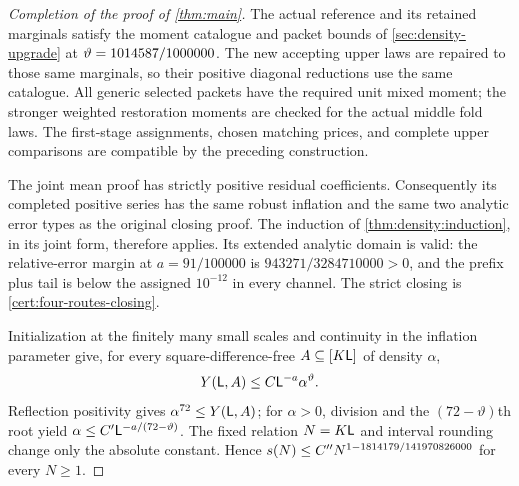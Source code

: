 \begin{proof}[Completion of the proof of \cref{thm:main}]
The actual reference and its retained marginals satisfy the moment
catalogue and packet bounds of \cref{sec:density-upgrade} at
$\vartheta=1014587/1000000$. The new accepting upper laws are
repaired to those same marginals, so their positive diagonal
reductions use the same catalogue. All generic selected packets
have the required unit mixed moment; the stronger weighted
restoration moments are checked for the actual middle fold laws.
The first-stage assignments, chosen matching prices, and complete
upper comparisons are compatible by the preceding construction.

The joint mean proof has strictly positive residual coefficients.
Consequently its completed positive series has the same robust
inflation and the same two analytic error types as the original
closing proof. The induction of \cref{thm:density:induction}, in
its joint form, therefore applies. Its extended analytic domain is
valid: the relative-error margin at $a=91/100000$ is
$943271/3284710000>0$, and the prefix plus tail is below the assigned
$10^{-12}$ in every channel. The strict closing is
\cref{cert:four-routes-closing}.

Initialization at the finitely many small scales and continuity in
the inflation parameter give, for every square-difference-free
$A\subseteq[K\mathsf L]$ of density $\alpha$,
\[
 Y(\mathsf L,A)\le C\mathsf L^{-a}\alpha^\vartheta.
\]
Reflection positivity gives $\alpha^{72}\le Y(\mathsf L,A)$; for $\alpha>0$,
division and the $(72-\vartheta)$th root yield
$\alpha\le C'\mathsf L^{-a/(72-\vartheta)}$.
The fixed relation $N=K\mathsf L$ and interval rounding change only the
absolute constant. Hence $s(N)\le C''N^{1-1814179/141970826000}$
for every $N\ge1$.
\end{proof}
